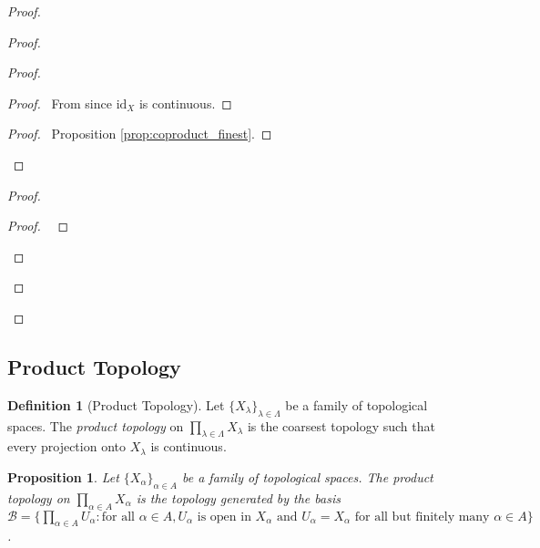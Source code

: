 \documentclass{book}
\let\qed\relax
\newtheorem{prop}[ax]{Proposition}
\theoremstyle{definition}
\newtheorem{df}[ax]{Definition}
\newcommand{\id}[1]{\ensuremath{\mathrm{id}_{#1}}}
\begin{document}
\begin{proof}
\begin{proof}
\begin{proof}
		\begin{proof}
			\pf\ From  since $\id{X}$ is continuous.
		\end{proof}
		\begin{proof}
			\pf\ Proposition \ref{prop:coproduct_finest}.
		\end{proof}
	\end{proof}
	\begin{proof}
		\begin{proof}
			\pf\ 
		\end{proof}
	\end{proof}
\end{proof}
\qed
\end{proof}

\subsection{Product Topology}

\begin{df}[Product Topology]
Let $\{ X_\lambda \}_{\lambda \in \Lambda}$ be a family of topological spaces. The \emph{product topology} on $\prod_{\lambda \in \Lambda} X_\lambda$ is the coarsest topology such that every projection onto $X_\lambda$ is continuous.
\end{df}

\begin{prop}
Let $\{ X_\alpha \}_{\alpha \in A}$ be a family of topological spaces. The product topology on $\prod_{\alpha \in A} X_\alpha$ is the topology generated by the basis $\mathcal{B} = \{ \prod_{\alpha \in A} U_\alpha : \text{for all } \alpha \in A, U_\alpha \text{ is open in } X_\alpha \text{ and } U_\alpha = X_\alpha \text{ for all but finitely many } \alpha \in A \}$.
\end{prop}
\end{document}
